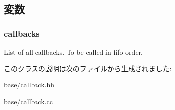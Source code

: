 \subsection{変数}
\hypertarget{classCallbackQueue_adea119b8021b9fd601349742aacced4a}{
\subsubsection[{callbacks}]{ {\bf callbacks}}}
\label{classCallbackQueue_adea119b8021b9fd601349742aacced4a}
List of all callbacks. To be called in fifo order. 

このクラスの説明は次のファイルから生成されました:\begin{DoxyCompactItemize}
\item 
base/\hyperlink{callback_8hh}{callback.hh}\item 
base/\hyperlink{callback_8cc}{callback.cc}\end{DoxyCompactItemize}
